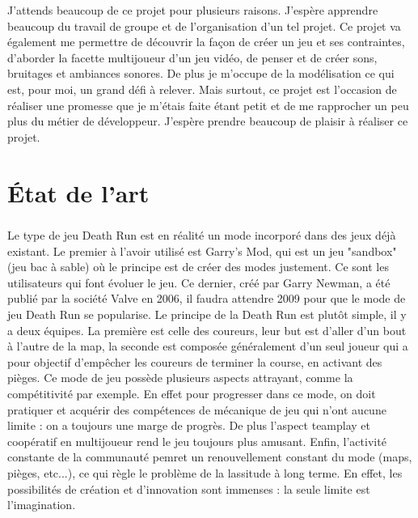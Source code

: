 \documentclass[12pt]{report}
\begin{document}
J'attends beaucoup de ce projet pour plusieurs raisons. J'espère apprendre beaucoup du travail de groupe et de l'organisation d'un tel projet. Ce projet va également me permettre de découvrir la façon de créer un jeu et ses contraintes, d'aborder la facette multijoueur d'un jeu vidéo, de penser et de créer sons, bruitages et ambiances sonores. De plus je m'occupe de la modélisation ce qui est, pour moi, un grand défi à relever. Mais surtout, ce projet est l'occasion de réaliser une promesse que je m'étais faite étant petit et de me rapprocher un peu plus du métier de développeur. J'espère prendre beaucoup de plaisir à réaliser ce projet.

\chapter{\'Etat de l'art}
	\paragraph{}
	Le type de jeu Death Run est en réalité un mode incorporé dans des jeux déjà existant. Le premier à l'avoir utilisé est Garry's Mod, qui est un jeu "sandbox" (jeu bac à sable) où le principe est de créer des modes justement. Ce sont les utilisateurs qui font évoluer le jeu. Ce dernier, créé par Garry Newman, a été publié par la société Valve en 2006, il faudra attendre 2009 pour que le mode de jeu Death Run se popularise. Le principe de la Death Run est plutôt simple, il y a deux équipes. La première est celle des coureurs, leur but est d'aller d'un bout à l'autre de la map, la seconde est composée généralement d'un seul joueur qui a pour objectif d'empêcher les coureurs de terminer la course, en activant des pièges. Ce mode de jeu possède plusieurs aspects attrayant, comme la compétitivité par exemple. En effet pour progresser dans ce mode, on doit pratiquer et acquérir des compétences de mécanique de jeu qui n'ont aucune limite : on a toujours une marge de progrès. De plus l'aspect teamplay et coopératif en multijoueur rend le jeu toujours plus amusant. Enfin, l'activité constante de la communauté pemret un renouvellement constant du mode (maps, pièges, etc...), ce qui règle le problème de la lassitude à long terme. En effet, les possibilités de création et d'innovation sont immenses : la seule limite est l'imagination.
\end{document}
